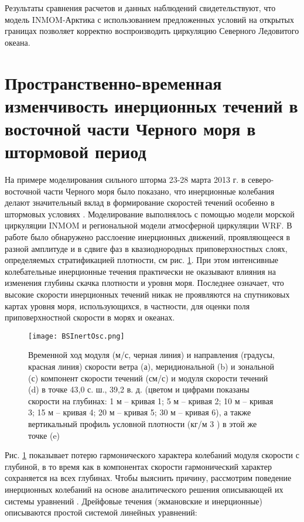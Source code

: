 Результаты сравнения расчетов и данных наблюдений свидетельствуют, что модель INMOM-Арктика с использованием предложенных условий на открытых границах позволяет корректно воспроизводить циркуляцию Северного Ледовитого океана.

\section{Пространственно-временная изменчивость инерционных течений в восточной части Черного моря в штормовой период}\label{sec:inmsom/ch1/sec5}

На примере моделирования сильного шторма 23-28 марта 2013 г. в северо-восточной части Черного моря было показано, что инерционные колебания делают значительный вклад в формирование скоростей течений особенно в штормовых условиях \cite{InertOsc2016}. Моделирование выполнялось с помощью модели морской циркуляции INMOM и региональной модели атмосферной циркуляции WRF.
В работе было обнаружено расслоение инерционных движений, проявляющееся в разной амплитуде и в сдвиге фаз в квазиоднородных приповерхностных слоях, определяемых стратификацией плотности, см рис. \ref{fig:intert_osc_bs}.
При этом интенсивные колебательные инерционные течения практически не оказывают влияния на изменения глубины скачка плотности и уровня моря.
Последнее означает, что высокие скорости инерционных течений никак не проявляются на спутниковых картах уровня моря, использующихся, в частности, для оценки поля приповерхностной скорости в морях и океанах.

\begin{figure}[htb!]
    \center
    \texttt{[image: BSInertOsc.png]}
    \caption{Временной ход модуля (м/с, черная линия) и направления (градусы, красная линия) скорости ветра (а), меридиональной (b) и зональной (с) компонент скорости течений (см/с) и модуля скорости течений (d) в точке 43,0 с. ш., 39,2 в. д. (цветом и цифрами показаны скорости на глубинах: 1 м – кривая 1; 5 м – кривая 2; 10 м – кривая 3; 15 м – кривая 4; 20 м – кривая 5; 30 м – кривая 6), а также вертикальный профиль условной плотности (кг/м 3 ) в этой же точке (e)}
    \label{fig:intert_osc_bs}
\end{figure}

Рис. \ref{fig:intert_osc_bs} показывает потерю гармонического характера колебаний модуля скорости с глубиной, в то время как в компонентах скорости гармонический
характер сохраняется на всех глубинах.
Чтобы выяснить причину, рассмотрим поведение инерционных колебаний на основе аналитического решения описывающей их системы уравнений \cite{DianskyInertOsc2019}.
Дрейфовые течения (экмановские и инерционные) описываются простой системой линейных уравнений:

